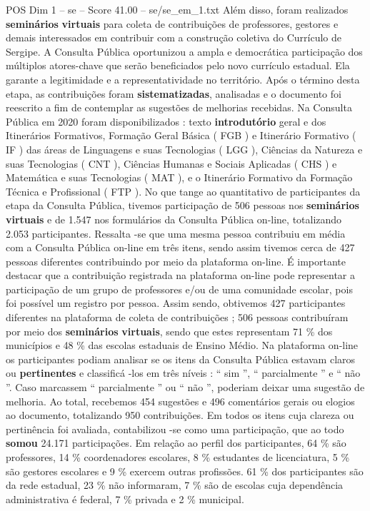 \begin{textsample}{POS Dim 1 – se – Score 41.00 – se/se\_em\_1.txt}
Além disso, foram realizados \textbf{seminários} \textbf{virtuais} para coleta de contribuições de professores, gestores e demais interessados em contribuir com a construção coletiva do Currículo de Sergipe.
A Consulta Pública oportunizou a ampla e democrática participação dos múltiplos atores-chave que serão beneficiados pelo novo currículo estadual.
Ela garante a legitimidade e a representatividade no território.
Após o término desta etapa, as contribuições foram \textbf{sistematizadas}, analisadas e o documento foi reescrito a fim de contemplar as sugestões de melhorias recebidas.
Na Consulta Pública em 2020 foram disponibilizados : texto \textbf{introdutório} geral e dos Itinerários Formativos, Formação Geral Básica ( FGB ) e Itinerário Formativo ( IF ) das áreas de Linguagens e suas Tecnologias ( LGG ), Ciências da Natureza e suas Tecnologias ( CNT ), Ciências Humanas e Sociais Aplicadas ( CHS ) e Matemática e suas Tecnologias ( MAT ), e o Itinerário Formativo da Formação Técnica e Profissional ( FTP ).
No que tange ao quantitativo de participantes da etapa da Consulta Pública, tivemos participação de 506 pessoas nos \textbf{seminários} \textbf{virtuais} e de 1.547 nos formulários da Consulta Pública on-line, totalizando 2.053 participantes.
Ressalta -se que uma mesma pessoa contribuiu em média com a Consulta Pública on-line em três itens, sendo assim tivemos cerca de 427 pessoas diferentes contribuindo por meio da plataforma on-line.
É importante destacar que a contribuição registrada na plataforma on-line pode representar a participação de um grupo de professores e/ou de uma comunidade escolar, pois foi possível um registro por pessoa.
Assim sendo, obtivemos 427 participantes diferentes na plataforma de coleta de contribuições ; 506 pessoas contribuíram por meio dos \textbf{seminários} \textbf{virtuais}, sendo que estes representam 71 \% dos municípios e 48 \% das escolas estaduais de Ensino Médio.
Na plataforma on-line os participantes podiam analisar se os itens da Consulta Pública estavam claros ou \textbf{pertinentes} e classificá -los em três níveis : “ sim ”, “ parcialmente ” e “ não ”.
Caso marcassem “ parcialmente ” ou “ não ”, poderiam deixar uma sugestão de melhoria.
Ao total, recebemos 454 sugestões e 496 comentários gerais ou elogios ao documento, totalizando 950 contribuições.
Em todos os itens cuja clareza ou pertinência foi avaliada, contabilizou -se como uma participação, que ao todo \textbf{somou} 24.171 participações.
Em relação ao perfil dos participantes, 64 \% são professores, 14 \% coordenadores escolares, 8 \% estudantes de licenciatura, 5 \% são gestores escolares e 9 \% exercem outras profissões. 61 \% dos participantes são da rede estadual, 23 \% não informaram, 7 \% são de escolas cuja dependência administrativa é federal, 7 \% privada e 2 \% municipal.

\end{textsample}
